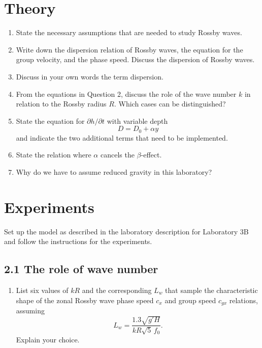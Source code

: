 \begin{question}
\section*{Theory}

\begin{enumerate}
    \item State the necessary assumptions that are needed to study Rossby waves.

    \item Write down the dispersion relation of Rossby waves, the equation for the group velocity, and the phase speed. Discuss the dispersion of Rossby waves.

    \item Discuss in your own words the term dispersion.

    \item From the equations in Question 2, discuss the role of the wave number $k$ in relation to the Rossby radius $R$. Which cases can be distinguished?

    \item State the equation for $\partial h / \partial t$ with variable depth
    \[
    D = D_0 + \alpha y
    \]
    and indicate the two additional terms that need to be implemented.

    \item State the relation where $\alpha$ cancels the $\beta$-effect.

    \item Why do we have to assume reduced gravity in this laboratory?
\end{enumerate}

\section*{Experiments}

Set up the model as described in the laboratory description for Laboratory 3B and follow the instructions for the experiments.

\subsection*{2.1 The role of wave number}

\begin{enumerate}
    \item List six values of $kR$ and the corresponding $L_w$ that sample the characteristic shape of the zonal Rossby wave phase speed $c_x$ and group speed $c_{gx}$ relations, assuming
    \[
    L_w = \frac{1.3\sqrt{g'H}}{kR \sqrt{5}\, f_0}.
    \]
    Explain your choice.


\end{enumerate}
\end{question}
